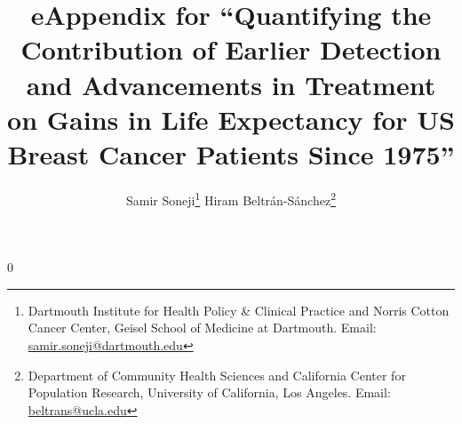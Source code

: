 \documentclass[11pt,letterpaper]{article}
\theoremstyle{plain}
\begin{document}
\newcommand\ud{\mathrm{d}}
\newcommand\dist{\buildrel\rm d\over\sim}
\newcommand\ind{\stackrel{\rm indep.}{\sim}}
\newcommand\iid{\stackrel{\rm i.i.d.}{\sim}}
\newcommand\logit{{\rm logit}}
\renewcommand\r{\right}
\renewcommand\l{\left}
\newcommand\cA{\mathcal{A}}
\newcommand\spacingset[1]{\renewcommand{\baselinestretch}%
{#1}\small\normalsize}

\newcommand{\blind}{0} \newcommand{\tit}{eAppendix for ``Quantifying the Contribution of Earlier Detection and Advancements in Treatment on Gains in Life Expectancy for US Breast Cancer Patients Since 1975''}

\blind

 {\title{\bf \tit}
 
  \author{Samir Soneji\thanks{Dartmouth Institute for Health Policy \&
      Clinical Practice and Norris Cotton Cancer Center,
      Geisel School of Medicine at Dartmouth. Email: \href{mailto:samir.soneji@dartmouth.edu}{samir.soneji@dartmouth.edu}}
  \quad \quad 
  Hiram Beltr\'{a}n-S\'{a}nchez\thanks{Department of Community Health Sciences and California Center for Population Research, University of California, Los Angeles. Email:
    \href{mailto:beltrans@ucla.edu}{beltrans@ucla.edu}}}

\date{ }

\maketitle} \fi


\end{document}
